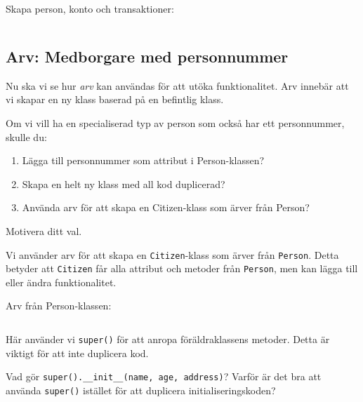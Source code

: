 \begin{frame}[fragile]
  \begin{example}
    Skapa person, konto och transaktioner:
    \inputminted[linenos,firstline=63,lastline=77]{python}{examples/bank.py}
  \end{example}
\end{frame}

\subsection{Arv: Medborgare med personnummer}

Nu ska vi se hur \emph{arv} kan användas för att utöka funktionalitet. 
Arv innebär att vi skapar en ny klass baserad på en befintlig klass.

\begin{exercise}
  Om vi vill ha en specialiserad typ av person som också har ett 
  personnummer, skulle du:
  \begin{enumerate}[label=\alph*)]
    \item Lägga till personnummer som attribut i Person-klassen?
    \item Skapa en helt ny klass med all kod duplicerad?
    \item Använda arv för att skapa en Citizen-klass som ärver från Person?
  \end{enumerate}
  Motivera ditt val.
\end{exercise}

Vi använder arv för att skapa en \texttt{Citizen}-klass som ärver 
från \texttt{Person}. Detta betyder att \texttt{Citizen} 
får alla attribut och metoder från \texttt{Person}, men kan lägga 
till eller ändra funktionalitet.

\begin{frame}[fragile]
  \begin{example}
    Arv från Person-klassen:
    \inputminted[linenos,firstline=53,lastline=61]{python}{examples/bank.py}
  \end{example}
\end{frame}

Här använder vi \texttt{super()} för att anropa föräldraklassens 
metoder. Detta är viktigt för att inte duplicera kod.

\begin{exercise}
  Vad gör \texttt{super().__init__(name, age, address)}?
  Varför är det bra att använda \texttt{super()} istället för 
  att duplicera initialiseringskoden?
\end{exercise}

